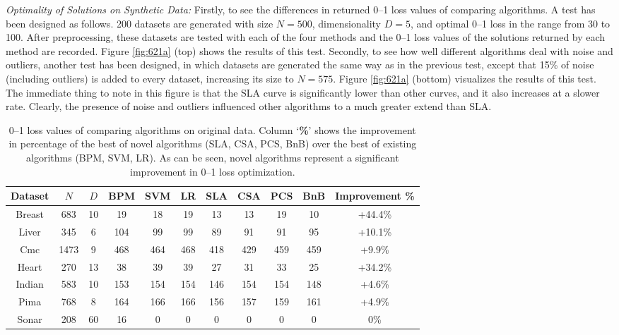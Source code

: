 \noindent\emph{Optimality of Solutions on Synthetic Data: }
Firstly, to see the differences in returned 0--1 loss values of
comparing algorithms. A test has been designed as follows. 200
datasets are generated with size $N=500$, dimensionality $D=5$, and
optimal 0--1 loss in the range from 30 to 100. After preprocessing,
these datasets are tested with each of the four methods and the 0--1
loss values of the solutions returned by each method are
recorded. Figure \ref{fig:621a} (top) shows the results of this test.
Secondly, to see how well different algorithms deal with noise and
outliers, another test has been designed, in which datasets are
generated the same way as in the previous test, except that 15\% of
noise (including outliers) is added to every dataset, increasing its
size to $N=575$. Figure \ref{fig:621a} (bottom) visualizes the results of this
test. The immediate thing to note in this figure is that the SLA curve
is significantly lower than other curves, and it also increases at a
slower rate. Clearly, the presence of noise and outliers influenced
other algorithms to a much greater extend than SLA. 


\begin{table}[htbp!]
\centering
{\footnotesize 
\begin{tabular}{|c|cc|  ccc|cccc|c|}
\hline\hline
{\bf Dataset} & $N$ & $D$ & {\bf BPM} & {\bf SVM} & {\bf LR} & {\bf SLA} & {\bf CSA} & {\bf PCS} & {\bf BnB} & {\bf Improvement \% }\\ 
\hline 
Breast	& 683 & 10 & 19 & 18 & 19 & 13 		& 13 & 19 & 10 & +44.4\%\\  
Liver	& 345 & 6 & 104 & 99 & 99 & 89 		& 91 & 91 & 95 & +10.1\%\\   
Cmc	& 1473 & 9 & 468 & 464 & 468 & 418 	& 429 & 459 & 459 & +9.9\%\\   
Heart  	& 270 & 13 & 38 & 39 & 39 & 27 		& 31 & 33 & 25 & +34.2\%\\  
Indian  & 583 & 10 & 153 & 154 & 154 & 146 	& 154 & 154 & 148 & +4.6\%\\    
Pima 	& 768 & 8  & 164 & 166 & 166 & 156 	& 157 & 159 & 161 & +4.9\%\\    
Sonar  	& 208 & 60 & 16 & 0 & 0 & 0 			& 0 & 0 & 0 & 0\%\\ 
\hline
\end{tabular}}
\caption{0--1 loss values of comparing algorithms on original
  data. Column `{\bf \%}' shows the improvement in percentage of the
  best of novel algorithms (SLA, CSA, PCS, BnB) over the best of
  existing algorithms (BPM, SVM, LR). As can be seen, novel algorithms
  represent a significant improvement in 0--1 loss optimization.}
\label{tab:losses0noise}
\end{table}


